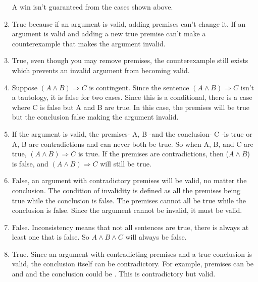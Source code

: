 \documentclass[]{article}
\begin{document}
\begin{enumerate}
    A win isn't guaranteed from the cases shown above. 
    

    
    \item True because if an argument is valid, adding  premises can't change it. If an argument is valid and adding a new true premise can't make a counterexample that makes the argument invalid.
    
    \item True, even though you may remove premises, the counterexample still exists which prevents an invalid argument from becoming valid.
    
    \item Suppose $(A \land B)\Rightarrow C$ is contingent. Since the sentence $(A \land B) \Rightarrow C$ isn't a tautology, it is false for two cases. Since this is a conditional, there is a case where C is false but A and B are true. In this case, the premises will be true but the conclusion false making the argument invalid. 
    
    \item If the argument is valid, the premises- A, B -and the conclusion- C -is true or A, B are contradictions and can never both be true. So when A, B, and C are true, $(A\land B)\Rightarrow C$ is true. If the premises are contradictions, then ($A\land B$) is false, and $(A\land B)\Rightarrow C$ will still be true.
    
    \item False, an argument with contradictory premises will be valid, no matter the conclusion. The condition of invalidity is defined as all the premises being true while the conclusion is false.  The premises cannot all be true while the conclusion is false. Since the argument cannot be invalid, it must be valid. 
    
    \item False. Inconsistency means that not all sentences are true, there is always at least one that is false. So $A \land B \land C$ will always be false.
    
    \item True. Since an argument with contradicting premises and a true conclusion is valid, the conclusion itself can be contradictory. For example, premises can be  and  and the conclusion could be . This is contradictory but valid.
    
\end{enumerate}
\end{document}
